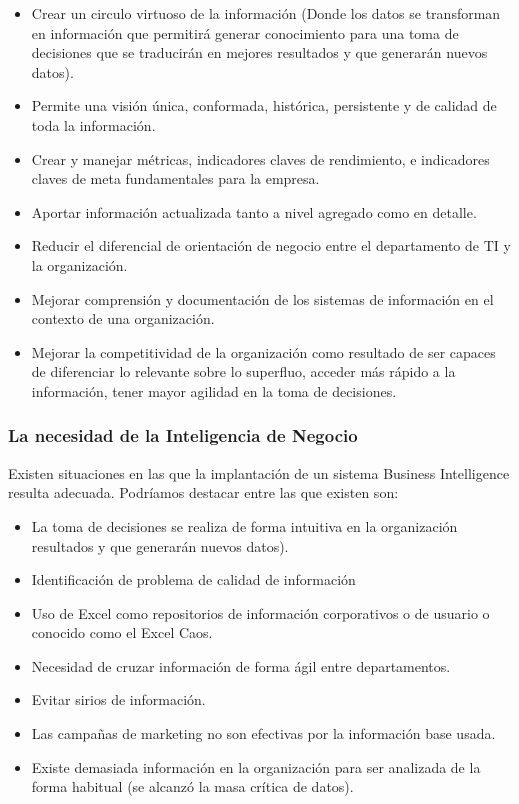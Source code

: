 \documentclass[preprint,12pt]{elsarticle}
\begin{document}
	\begin{itemize}
	\item Crear un circulo virtuoso de la información (Donde los datos se transforman en información que permitirá 
		generar conocimiento para una toma de decisiones que se traducirán en mejores resultados y que 
		generarán nuevos datos).
	\item Permite una visión única, conformada, histórica, persistente y de calidad de toda la información. 
	\item Crear y manejar métricas, indicadores claves de rendimiento, e indicadores claves de meta fundamentales 
		para la empresa.
	\item Aportar información actualizada tanto a nivel agregado como en detalle.
	\item Reducir el diferencial de orientación de negocio entre el departamento de TI y la organización. 
	\item Mejorar comprensión y documentación de los sistemas de información en el contexto de una organización.
	\item Mejorar la competitividad de la organización como resultado de ser capaces de diferenciar lo relevante sobre 
		lo superfluo, acceder más rápido a la información, tener mayor agilidad en la toma de decisiones.
	\end{itemize}
	\subsubsection{\textbf{La necesidad de la Inteligencia de Negocio}}
	Existen situaciones en las que la implantación de un sistema Business Intelligence  resulta adecuada. Podríamos destacar 
	entre las que existen son:

	\begin{itemize}
	\item La toma de decisiones se realiza de forma intuitiva en la organización resultados y que generarán nuevos datos).
	\item Identificación de problema de calidad de información
	\item Uso de Excel como repositorios de información corporativos o de usuario o conocido como el Excel Caos.
	\item Necesidad de cruzar información de forma ágil entre departamentos.
	\item Evitar sirios de información.
	\item Las campañas de marketing no son efectivas por la información base usada. 
	\item Existe demasiada información en la organización para ser analizada de la forma habitual (se alcanzó la masa crítica de datos).
	\end{itemize}
\end{document}
